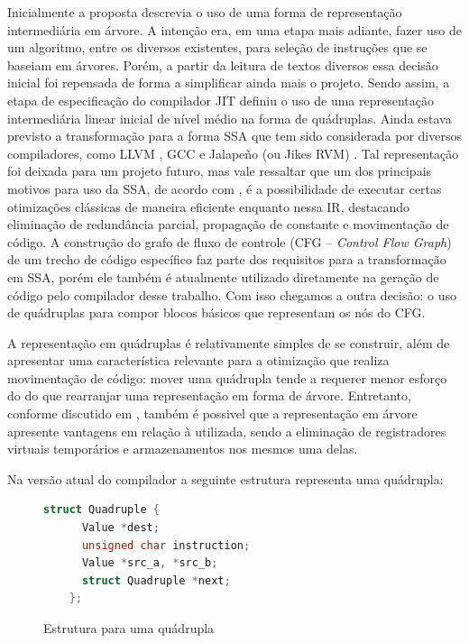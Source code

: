 Inicialmente a proposta descrevia o uso de uma forma de representação
intermediária em árvore. A intenção era, em uma etapa mais adiante,
fazer uso de um algoritmo, entre os diversos existentes, para seleção
de instruções que se baseiam em árvores. %
Porém, a partir da leitura de
textos diversos essa decisão inicial foi repensada de forma a
simplificar ainda mais o projeto.
Sendo assim, a etapa de especificação do compilador JIT
definiu o uso de uma representação intermediária linear inicial de nível
médio na forma de
quádruplas. Ainda estava previsto a transformação para a forma SSA que
tem sido considerada por diversos compiladores, como LLVM
\cite{llvm1}, GCC \cite{gcc-ssa} e Jalapeño (ou Jikes RVM)
\cite{jalapeno_1}. Tal representação foi deixada para um projeto futuro,
mas vale ressaltar que um dos principais motivos para uso da SSA, de
acordo com , é a possibilidade de executar certas
otimizações clássicas de maneira eficiente
enquanto nessa IR, destacando eliminação de redundância parcial,
propagação de constante e movimentação de código.
A construção do grafo de fluxo de controle (CFG
-- \textit{Control Flow Graph}) de um trecho de código específico faz
parte dos requisitos para a transformação em SSA, porém ele também é
atualmente utilizado diretamente na geração de código pelo compilador
desse trabalho. Com isso
chegamos a outra decisão: o uso de quádruplas para compor blocos
básicos que representam os nós do CFG.

A representação em quádruplas é relativamente simples de se construir,
além de apresentar uma característica relevante para a otimização que
realiza movimentação de código: mover uma quádrupla tende a requerer
menor esforço do do que rearranjar uma representação em forma de
árvore. Entretanto, conforme discutido em ,
também é possivel que a representação em árvore apresente vantagens
em relação à utilizada, sendo a eliminação de registradores virtuais
temporários e armazenamentos nos mesmos uma delas.

Na versão atual do compilador a seguinte estrutura representa uma
quádrupla:

\begin{figure}[h]
  \centering
  \begin{lstlisting}[language=C]
    struct Quadruple {
      Value *dest;
      unsigned char instruction;
      Value *src_a, *src_b;
      struct Quadruple *next;
    };
  \end{lstlisting}
  \caption{Estrutura para uma quádrupla\label{quad-struct}}
\end{figure}

